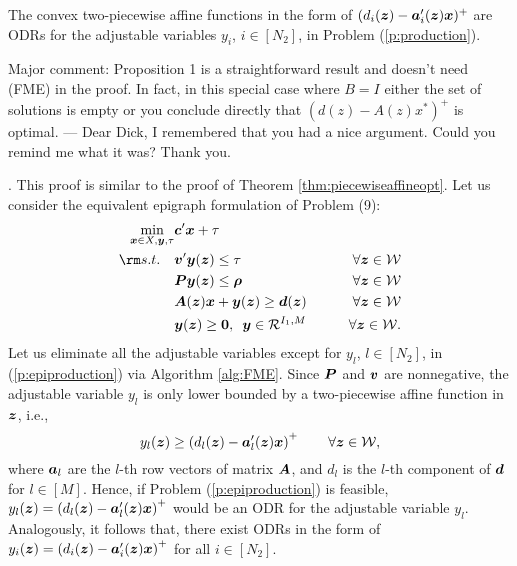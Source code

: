 \documentclass[fleqn,isre,blindrev]{informs4}
\newcommand{\mb}[1]{\mbox{\boldmath \ensuremath{#1}}}
\begin{document}
	\begin{proposition} \label{prop:2piecewiseaffineopt}
		The convex two-piecewise affine functions in the form of $(d_i(\mb{z})-\mb{a}'_i(\mb{z})\mb{x})^+$ are ODRs for the adjustable variables $y_i$, $i\in [N_2]$, in Problem (\ref{p:production}).
	\end{proposition}
	
	 {Major comment: Proposition 1 is a straightforward result and doesn’t need (FME) in the proof. In fact, in this special case where $B = I$ either the set of solutions is empty or you conclude directly that $(d(z)- A(z)x^*)^+$ is optimal. --- Dear Dick, I remembered that you had a nice argument. Could you remind me what it was? Thank you.}
	
	. This proof is similar to the proof of Theorem \ref{thm:piecewiseaffineopt}. Let us consider the equivalent epigraph formulation of Problem (9):
\begin{equation} \label{p:epiproduction}
		\begin{aligned} 
		\min_{ \boldsymbol{x} \in X,  \boldsymbol{y}, \tau}  &  \mb{c}'\mb{x} +  \tau \\
		{\rm s.t.} \quad  &    \mb{v}'\mb{y}(\mb{z}) \le  \tau \qquad & \forall \mb{z} \in \mathcal{W}\\
		&\mb{P}\mb{y}(\mb{z}) \le \mb{\rho} \qquad & \forall \mb{z} \in \mathcal{W} \\
		& \mb{A}(\mb{z})\mb{x} + \mb{y}(\mb{z}) \ge \mb{d}(\mb{z}) \qquad & \forall \mb{z} \in \mathcal{W} \\
		& \mb{y}(\mb{z}) \ge \mb{0}, \,\,\,  \mb{y} \in \mathcal{R}^{I_1,M} & \forall \mb{z} \in \mathcal{W}.
		\end{aligned}
\end{equation}
	Let us eliminate all the adjustable variables except for $y_{l}$, $l \in [N_2]$, in (\ref{p:epiproduction}) via Algorithm \ref{alg:FME}.  Since $\mb{P}$ and $\mb{v}$ are nonnegative, the adjustable variable $y_{l}$ is only lower bounded by a two-piecewise affine function in $\mb{z}$, i.e.,
\begin{equation*}
	 y_{l}(\mb{z}) \ge \left(d_l(\mb{z})-\mb{a}'_l(\mb{z})\mb{x} \right)^+  \qquad \forall \mb{z} \in \mathcal{W},
\end{equation*}
	where $\mb{a}_l$ are the $l$-th row vectors of matrix $\mb{A}$, and $d_l$ is the $l$-th component of $\mb{d}$ for $l \in [M]$. Hence, if Problem (\ref{p:epiproduction}) is feasible, $y_{l}(\mb{z}) = \left( d_l(\mb{z})-\mb{a}'_l(\mb{z})\mb{x}\right)^+$ would be an ODR for the adjustable variable $y_l$. Analogously, it follows that, there exist ODRs in the form of  $y_{i}(\mb{z})=\left( d_i(\mb{z})-\mb{a}'_i(\mb{z})\mb{x}\right)^+$ for all $i\in [N_2]$. 	 \hfill \Halmos\\
\end{document}
